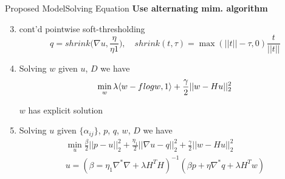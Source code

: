\documentclass{beamer}
\begin{document}
\begin{frame}{Proposed Model}{Solving Equation}
\textbf{Use alternating mim. algorithm }
    \setlength{\abovedisplayskip}{3pt}
    \setlength{\belowdisplayskip}{3pt}

\begin{enumerate}
     \setcounter{enumi}{2}
     \item cont'd pointwise soft-thresholding
     \[
         q = shrink\bigg(\nabla u, \frac{\eta}{\eta1}\bigg),\quad  shrink(t, \tau) = \max(||t||-\tau, 0)\frac{t}{||t||}
     \]

     \item Solving $w$ given $u$, $D$ we have
     \[
       \min_{w}  \lambda\langle w-f\hspace{0.25pt}log w,1\rangle + \frac{\gamma}{2}||w - Hu||^2_2 
     \]

     $w$ has explicit solution

     \item Solving $u$ given $\{\alpha_{ij}\}$, $p$, $q$, $w$, $D$ we have 
     \[
     \begin{split}
     \min_{u}\frac{\beta}{2}||p-u||^2_2+\frac{\eta_1}{2}||\nabla u - q||^2_2 + \frac{\gamma}{2}||w - Hu||^2_2 
     \\
     u = (\beta = \eta_1\nabla^*\nabla + \lambda H^TH)^{-1}(\beta p + \eta \nabla^*q+\lambda H^Tw)
     \end{split}
    \]
\end{enumerate}

\end{frame}
\end{document}
